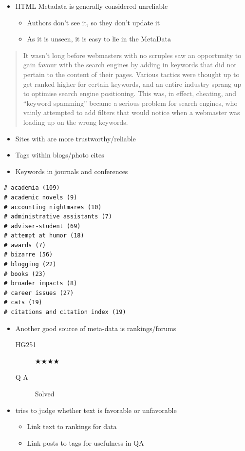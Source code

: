 \documentclass[a4paper,landscape,headrule,footrule,xetex]{foils}
\begin{document}
\begin{itemize}
\item HTML Metadata is generally considered unreliable
  \begin{itemize}
  \item Authors don't see it, so they don't update it
  \item As it is unseen, it is easy to lie in the MetaData
  \end{itemize}
\end{itemize}
\begin{quotation} \small 
  It wasn't long before webmasters with no scruples saw an opportunity to gain favour with the search engines by adding in keywords that did not pertain to the content of their pages. Various tactics were thought up to get ranked higher for certain keywords, and an entire industry sprang up to optimise search engine positioning. This was, in effect, cheating, and ``keyword spamming'' became a serious problem for search engines, who vainly attempted to add filters that would notice when a webmaster was loading up on the wrong keywords.
\end{quotation}



\begin{itemize}
\item Sites with  are more trustworthy/reliable
\item Tags within blogs/photo cites
\item Keywords in journals and conferences
\end{itemize}

\begin{verbatim}
# academia (109)
# academic novels (9)
# accounting nightmares (10)
# administrative assistants (7)
# adviser-student (69)
# attempt at humor (18)
# awards (7)
# bizarre (56)
# blogging (22)
# books (23)
# broader impacts (8)
# career issues (27)
# cats (19)
# citations and citation index (19) 
\end{verbatim}


\MyLogo{}

\begin{itemize}
\item Another good source of meta-data is rankings/forums
  \begin{description}
  \item[HG251] ★★★★
  \item[Q A] Solved
  \end{description}
\item {} tries to judge whether text is favorable or unfavorable
  \begin{itemize}
  \item Link text to rankings for data
  \item Link posts to tags for usefulness in QA
  \end{itemize}
\end{itemize}
\end{document}
